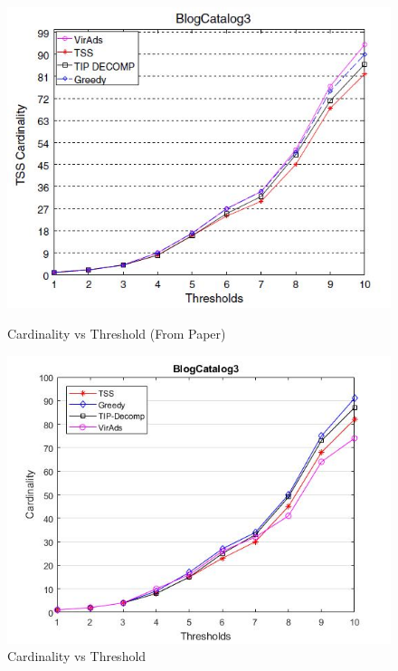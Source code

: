 \begin{figure}[h!]
\begin{minipage}[t]{0.50\textwidth}
\includegraphics[width=\linewidth,keepaspectratio=true]{images/bc3paper.jpg}
\caption{Cardinality vs Threshold (From Paper)}
\label{fase1}
\end{minipage}
\begin{minipage}[t]{0.50\textwidth}
\includegraphics[width=\linewidth,keepaspectratio=true]{images/bc3result.jpg}
\caption{Cardinality vs Threshold}
\end{minipage}
\end{figure}

